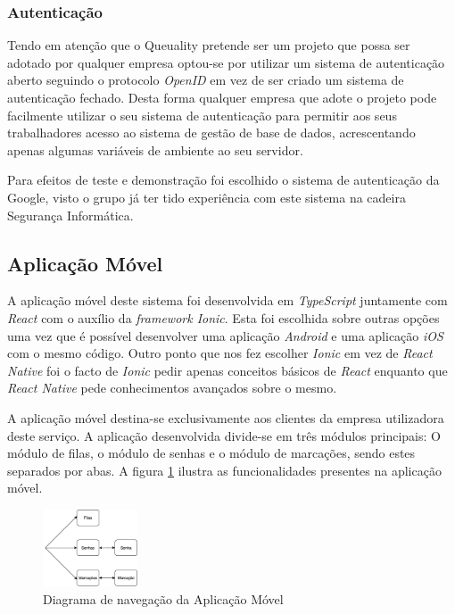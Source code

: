 \documentclass[12pt,a4paper]{article}
\begin{document}
\subsubsection{Autenticação}
Tendo em atenção que o Queuality pretende ser um projeto que possa ser adotado por qualquer empresa optou-se por utilizar um sistema de autenticação
aberto seguindo o protocolo \textit{OpenID}\cite{openIDReference} em vez de ser criado um sistema de autenticação fechado. Desta forma qualquer empresa que adote o projeto
pode facilmente utilizar o seu sistema de autenticação para permitir aos seus trabalhadores acesso ao sistema de gestão de base de dados, acrescentando
apenas algumas variáveis de ambiente ao seu servidor.

Para efeitos de teste e demonstração foi escolhido o sistema de autenticação da Google, visto o grupo já ter tido experiência com este sistema na cadeira 
Segurança Informática.
\pagebreak
\subsection{Aplicação Móvel}
A aplicação móvel deste sistema foi desenvolvida em \textit{TypeScript}\cite{typescriptReference} juntamente com \textit{React}\cite{reactReference} 
com o auxílio da \textit{framework Ionic}\cite{ionicReference}. Esta foi escolhida sobre outras opções uma vez que é possível desenvolver uma aplicação \textit{Android}
e uma aplicação \textit{iOS} com o mesmo código. Outro ponto que nos fez escolher \textit{Ionic}\cite{ionicReference} em vez de \textit{React Native}\cite{reactNativeReference} foi o facto de \textit{Ionic}\cite{ionicReference}
pedir apenas conceitos básicos de \textit{React}\cite{reactReference} enquanto que \textit{React Native}\cite{reactNativeReference} pede conhecimentos avançados sobre o mesmo.\par
A aplicação móvel destina-se exclusivamente aos clientes da empresa utilizadora deste serviço. 
A aplicação desenvolvida divide-se em três módulos principais: O módulo de filas, o módulo de senhas
e o módulo de marcações, sendo estes separados por abas. A figura \ref{fig:diam} ilustra as funcionalidades presentes na aplicação móvel.\par
\begin{figure}[h]
    \centering
    \includegraphics[width=0.25\textwidth]{DiagramaMobileApp}
    \caption{Diagrama de navegação da Aplicação Móvel}
    \label{fig:diam}
\end{figure}
\end{document}
